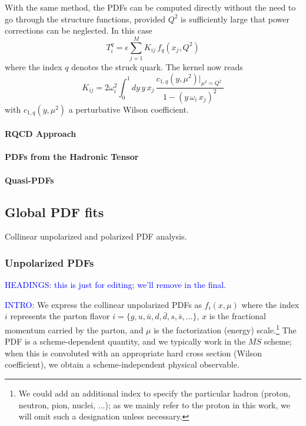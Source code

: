 With the same method, the PDFs can be computed directly without the need to go through the structure functions, provided $Q^2$ is
sufficiently large that power corrections can be neglected. In this case
\begin{equation}
T_i^q = \epsilon \sum_{j=1}^M K_{ij}\, f_q(x_j,Q^2) 
\end{equation}
where the index $q$ denotes the struck quark. The kernel now reads
\begin{equation}
K_{ij} =2 \omega_i^2 \int_0^1 dy\,y\,x_j\, \frac{c_{1,q}(y,\mu^2)|_{\mu^2=Q^2}\, }{1-(y\,\omega_i\, x_j)^2}
\end{equation}
with $c_{1,q}(y,\mu^2)$ a perturbative Wilson coefficient.

\paragraph{RQCD Approach}

\paragraph{PDFs from the Hadronic Tensor}


\paragraph{Quasi-PDFs}





\subsection{Global PDF fits}

Collinear unpolarized and polarized PDF analysis.

\subsubsection{Unpolarized PDFs}




\textcolor{blue}{HEADINGS: this is just for editing; we'll remove in the final. }

\textcolor{blue}{INTRO:} 
We express the collinear unpolarized PDFs as $f_{i}(x,\mu)$
where the index $i$ represents the parton flavor $i=\{g,u,\bar{u},d,\bar{d},s,\bar{s},...\}$,
$x$ is the fractional momentum carried by the parton, and $\mu$
is the factorization (energy) scale.\footnote{We could add an additional index to specify the particular hadron
(proton, neutron, pion, nuclei, ...); as we mainly refer to the proton
in this work, we will omit such a designation unless necessary.} The PDF is a scheme-dependent quantity, and we typically work in
the $\overline{MS}$ scheme; when this is convoluted with an appropriate
hard cross section (Wilson coefficient), we obtain a scheme-independent
physical observable. 

